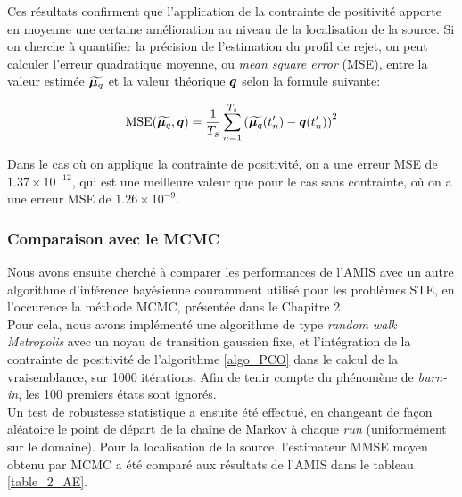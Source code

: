     Ces résultats confirment que l'application de la contrainte de positivité apporte en moyenne une certaine amélioration au niveau de la localisation de la source. Si on cherche à quantifier la précision de l'estimation du profil de rejet, on peut calculer l'erreur quadratique moyenne, ou \textit{mean square error} (MSE), entre la valeur estimée ${\widetilde{{\bm{\mu}_q}}}$ et la valeur théorique ${\bm{q}}$ selon la formule suivante: 
    
    \begin{equation}
    \text{MSE}({\widetilde{{\bm{\mu}_q}}}, {\bm{q}}) = \dfrac{1}{T_s}\sum\limits_{n=1}^{T_s}\left({\widetilde{{\bm{\mu}_q}}}(t'_n) - {\bm{q}}(t'_n)\right)^2
    \label{eq_AE_31}
    \end{equation}
    
Dans le cas où on applique la contrainte de positivité, on a une erreur MSE de $1.37\times10^{-12}$, qui est une meilleure valeur que pour le cas sans contrainte, où on a une erreur MSE de $1.26\times10^{-9}$.  \\

\subsubsection{Comparaison avec le MCMC}

Nous avons ensuite cherché à comparer les performances de l'AMIS avec un autre algorithme d'inférence bayésienne couramment utilisé pour les problèmes STE, en l'occurence la méthode MCMC, présentée dans le Chapitre 2. \\

Pour cela, nous avons implémenté une algorithme de type \textit{random walk Metropolis}  avec un noyau de transition gaussien fixe, et l'intégration de la contrainte de positivité de l'algorithme \ref{algo_PCO} dans le calcul de la vraisemblance, sur 1000 itérations. Afin de tenir compte du phénomène de \textit{burn-in}, les 100 premiers états sont ignorés. \\

Un test de robustesse statistique a ensuite été effectué, en changeant de façon aléatoire le point de départ de la chaîne de Markov à chaque \textit{run} (uniformément sur le domaine). Pour la localisation de la source, l'estimateur MMSE moyen obtenu par MCMC a été comparé aux résultats de l'AMIS dans le tableau \ref{table_2_AE}. \\

